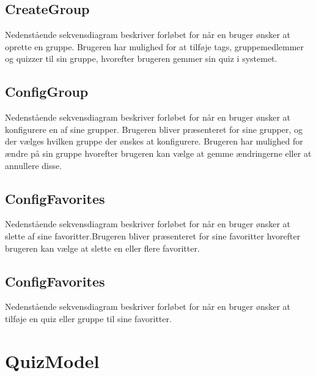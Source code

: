 
\subsection*{CreateGroup}
Nedenstående sekvensdiagram beskriver forløbet for når en bruger ønsker at oprette en gruppe. Brugeren har mulighed for at tilføje tags, gruppemedlemmer og quizzer til sin gruppe, hvorefter brugeren gemmer sin quiz i systemet.


\subsection*{ConfigGroup}
Nedenstående sekvensdiagram beskriver forløbet for når en bruger ønsker at konfigurere en af sine grupper. Brugeren bliver præsenteret for sine grupper, og der vælges hvilken gruppe der ønskes at konfigurere. Brugeren har mulighed for ændre på sin gruppe hvorefter brugeren kan vælge at gemme ændringerne eller at annullere disse.


\subsection*{ConfigFavorites}
Nedenstående sekvensdiagram beskriver forløbet for når en bruger ønsker at slette af sine favoritter.Brugeren bliver præsenteret for sine favoritter hvorefter brugeren kan vælge at slette en eller flere favoritter.


\subsection*{ConfigFavorites}
Nedenstående sekvensdiagram beskriver forløbet for når en bruger ønsker at tilføje en quiz eller gruppe til sine favoritter.



\section{QuizModel}

